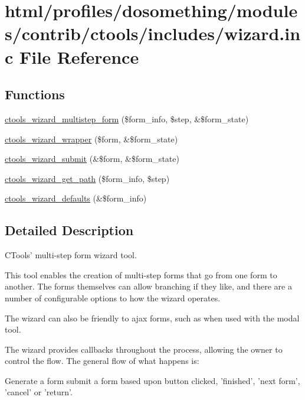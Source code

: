 \hypertarget{wizard_8inc}{
\section{html/profiles/dosomething/modules/contrib/ctools/includes/wizard.inc File Reference}
\label{wizard_8inc}
}
\subsection*{Functions}
\begin{DoxyCompactItemize}
\item 
\hyperlink{wizard_8inc_a0b42108018cbf45ee377a2fbbe980716}{ctools\_\-wizard\_\-multistep\_\-form} (\$form\_\-info, \$step, \&\$form\_\-state)
\item 
\hyperlink{wizard_8inc_a2373e7bfdb5d0ad17fcbe1802606dd46}{ctools\_\-wizard\_\-wrapper} (\$form, \&\$form\_\-state)
\item 
\hyperlink{wizard_8inc_a29fd9e85f0e0e87557a80b3b960a61d1}{ctools\_\-wizard\_\-submit} (\&\$form, \&\$form\_\-state)
\item 
\hyperlink{wizard_8inc_afc7a25ab27f2c6ec84fe095b4be44541}{ctools\_\-wizard\_\-get\_\-path} (\$form\_\-info, \$step)
\item 
\hyperlink{wizard_8inc_aa26a3f8dffd117ea24de566d81f34bf9}{ctools\_\-wizard\_\-defaults} (\&\$form\_\-info)
\end{DoxyCompactItemize}


\subsection{Detailed Description}
CTools' multi-\/step form wizard tool.

This tool enables the creation of multi-\/step forms that go from one form to another. The forms themselves can allow branching if they like, and there are a number of configurable options to how the wizard operates.

The wizard can also be friendly to ajax forms, such as when used with the modal tool.

The wizard provides callbacks throughout the process, allowing the owner to control the flow. The general flow of what happens is:

Generate a form submit a form based upon button clicked, 'finished', 'next form', 'cancel' or 'return'.

